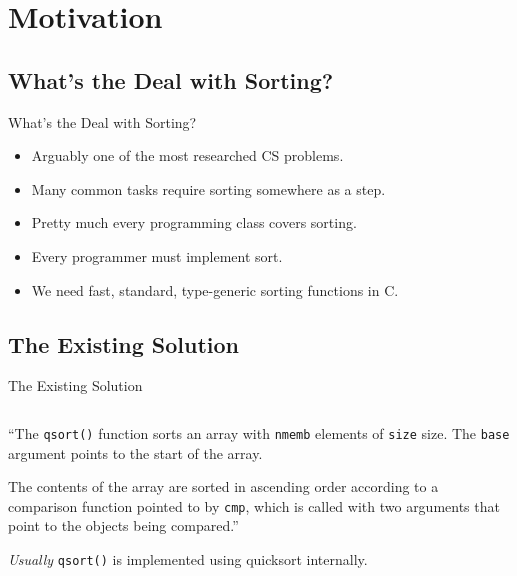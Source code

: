 \documentclass[13pt]{beamer}
\begin{document}
\section{Motivation}
\subsection{What's the Deal with Sorting?}
\begin{frame}{What's the Deal with Sorting?}
	\pause
	\begin{itemize}[<+->]
		\item Arguably one of the most researched CS problems.
		\item Many common tasks require sorting somewhere as a step.
		\item Pretty much every programming class covers sorting.
		\item Every programmer must implement sort.
		\item We need fast, standard, type-generic sorting functions in C.
	\end{itemize}
\end{frame}

\subsection{The Existing Solution}
\begin{frame}[c]{The Existing Solution}
	\begin{center}
		\begin{minipage}{0.8\textwidth}
			\inputminted{c}{include.c}
		\end{minipage}

		\pause
		\vspace{0.3cm}
		\begin{displayquote}
			``The \texttt{qsort()} function sorts an array with \texttt{nmemb}
			elements of \texttt{size} size. The \texttt{base} argument points to the
			start of the array.

			The contents of the array are sorted in ascending order according to a
			comparison function pointed to by \texttt{cmp}, which is called with two
			arguments that point to the objects being compared.''
		\end{displayquote}

		\pause
		\textit{Usually} \texttt{qsort()} is implemented using quicksort internally.
	\end{center}
\end{frame}
\end{document}
